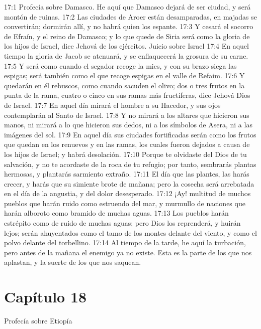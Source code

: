 17:1 Profecía sobre Damasco. He aquí que Damasco dejará de ser ciudad, y será montón de ruinas. 
17:2 Las ciudades de Aroer están desamparadas, en majadas se convertirán; dormirán allí, y no habrá quien los espante. 
17:3 Y cesará el socorro de Efraín, y el reino de Damasco; y lo que quede de Siria será como la gloria de los hijos de Israel, dice Jehová de los ejércitos. 
Juicio sobre Israel 
17:4 En aquel tiempo la gloria de Jacob se atenuará, y se enflaquecerá la grosura de su carne. 
17:5 Y será como cuando el segador recoge la mies, y con su brazo siega las espigas; será también como el que recoge espigas en el valle de Refaim. 
17:6 Y quedarán en él rebuscos, como cuando sacuden el olivo; dos o tres frutos en la punta de la rama, cuatro o cinco en sus ramas más fructíferas, dice Jehová Dios de Israel. 
17:7 En aquel día mirará el hombre a su Hacedor, y sus ojos contemplarán al Santo de Israel. 
17:8 Y no mirará a los altares que hicieron sus manos, ni mirará a lo que hicieron sus dedos, ni a los símbolos de Asera, ni a las imágenes del sol. 
17:9 En aquel día sus ciudades fortificadas serán como los frutos que quedan en los renuevos y en las ramas, los cuales fueron dejados a causa de los hijos de Israel; y habrá desolación. 
17:10 Porque te olvidaste del Dios de tu salvación, y no te acordaste de la roca de tu refugio; por tanto, sembrarás plantas hermosas, y plantarás sarmiento extraño. 
17:11 El día que las plantes, las harás crecer, y harás que su simiente brote de mañana; pero la cosecha será arrebatada en el día de la angustia, y del dolor desesperado. 
17:12 ¡Ay! multitud de muchos pueblos que harán ruido como estruendo del mar, y murmullo de naciones que harán alboroto como bramido de muchas aguas. 
17:13 Los pueblos harán estrépito como de ruido de muchas aguas; pero Dios los reprenderá, y huirán lejos; serán ahuyentados como el tamo de los montes delante del viento, y como el polvo delante del torbellino. 
17:14 Al tiempo de la tarde, he aquí la turbación, pero antes de la mañana el enemigo ya no existe. Esta es la parte de los que nos aplastan, y la suerte de los que nos saquean. 
\section*{Capítulo 18 }
Profecía sobre Etiopía 
 
